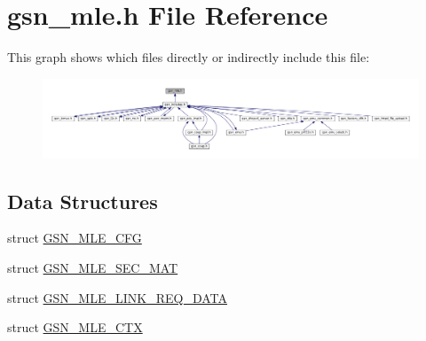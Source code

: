 \hypertarget{a00527}{
\section{gsn\_\-mle.h File Reference}
\label{a00527}
}
This graph shows which files directly or indirectly include this file:
\nopagebreak
\begin{figure}[H]
\begin{center}
\leavevmode
\includegraphics[width=400pt]{a00762}
\end{center}
\end{figure}
\subsection*{Data Structures}
\begin{DoxyCompactItemize}
\item 
struct \hyperlink{a00150}{GSN\_\-MLE\_\-CFG}
\item 
struct \hyperlink{a00153}{GSN\_\-MLE\_\-SEC\_\-MAT}
\item 
struct \hyperlink{a00152}{GSN\_\-MLE\_\-LINK\_\-REQ\_\-DATA}
\item 
struct \hyperlink{a00151}{GSN\_\-MLE\_\-CTX}
\end{DoxyCompactItemize}
